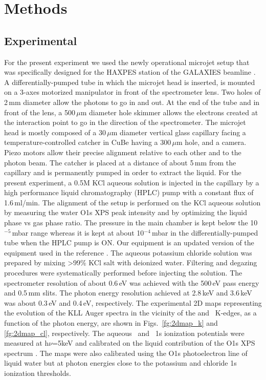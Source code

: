 \section{Methods} \label{sec:methods}
\subsection{Experimental}

For the present experiment we used the newly operational microjet setup that was specifically designed for the HAXPES station of the GALAXIES beamline \citep{ceolin13:188,rueff15:175}. A differentially-pumped tube in which the microjet head is inserted, is mounted on a 3-axes motorized manipulator in front of the spectrometer lens. Two holes of 2\,mm diameter allow the photons to go in and out. At the end of the tube and in front of the lens, a 500\,$\mu$m diameter hole skimmer allows the electrons created at the interaction point to go in the direction of the spectrometer. The microjet head is mostly composed of a 30\,$\mu$m diameter vertical glass capillary facing a temperature-controlled catcher in CuBe having a 300\,$\mu$m hole, and a camera. Piezo motors allow their precise alignment relative to each other and to the photon beam. The catcher is placed at a distance of about 5\,mm from the capillary and is permanently pumped in order to extract the liquid. For the present experiment, a 0.5M KCl aqueous solution is injected in the capillary by a high performance liquid chromatography (HPLC) pump with a constant flux of 1.6\,ml/min. The alignment of the setup is performed on the KCl aqueous solution by measuring the water O1s XPS peak intensity and by optimizing the liquid phase vs gas phase ratio. The pressure in the main chamber is kept below the 10$^{-5}$\,mbar range whereas it is kept at about 10$^{-4}$\,mbar in the differentially-pumped tube when the HPLC pump is ON. Our equipment is an updated version of the equipment used in the reference \cite{faubel88:269}. The aqueous potassium chloride solution was prepared by mixing >99\% KCl salt with deionized water. Filtering and degazing procedures were systematically performed before injecting the solution. The spectrometer resolution of about 0.6\,eV was achieved with the 500\,eV pass energy and 0.5\,mm slits. The photon energy resolution achieved at 2.8\,keV and 3.6\,keV was about 0.3\,eV and 0.4\,eV, respectively. The experimental 2D maps representing the evolution of the KLL Auger spectra in the vicinity of the \cli and \ki~K-edges, as a function of the photon energy, are shown in Figs.\ \ref{fg:2dmap_k} and \ref{fg:2dmap_cl}, respectively. The aqueous \ki~and \cli~1s ionization potentials were measured at h$\nu$=5keV and calibrated on the liquid contribution of the O1s XPS spectrum \cite{winter06:1176}. The maps were also calibrated using the O1s photoelectron line of liquid water but at photon energies close to the potassium and chloride 1s ionization thresholds.


